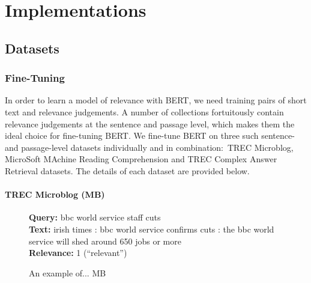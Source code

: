 \chapter{Implementations}

\section{Datasets}


\subsection{Fine-Tuning}

In order to learn a model of relevance with BERT, we need training pairs of short text and relevance judgements.
A number of collections fortuitously contain relevance judgements at the sentence and passage level, which makes them the ideal choice for fine-tuning BERT.
We fine-tune BERT on three such sentence- and passage-level datasets individually and in combination:\ TREC Microblog, MicroSoft MAchine Reading Comprehension and TREC Complex Answer Retrieval datasets.
The details of each dataset are provided below.

\subsubsection{TREC Microblog (MB)}

\begin{figure}[b!]
	\begin{framed}
		\centering
    		\textbf{Query:} bbc world service staff cuts \\
    		\textbf{Text:} irish times : bbc world service confirms cuts : the bbc world service will shed around 650 jobs or more \\
    		\textbf{Relevance:} 1 (``relevant'')
	\end{framed}
\label{mb-example}
 \caption{An example of... MB}
\end{figure}

